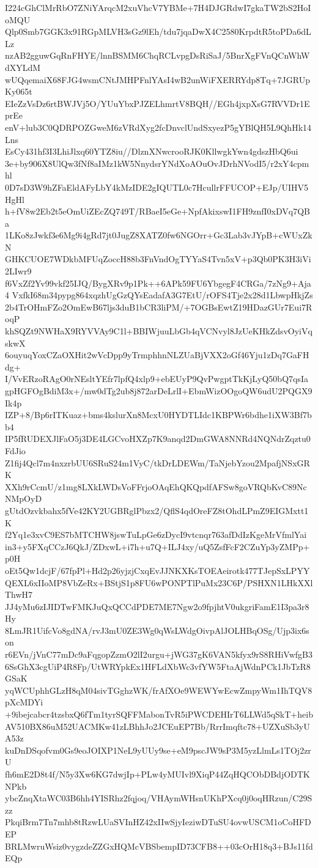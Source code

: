 I224cGhClMrRbO7ZNiYArqcM2xuVhcV7YBMe+7H4DJGRdwI7gkaTW2bS2HoIoMQU
Qlp0Smb7GGK3x91RGpMLVH3sGz9lEh/tdu7jqaDwX4C2580KrpdtR5toPDa6dLLz
nzAB2gguwGqRnFHYE/lnnBSMM6ChqRCLvpgDsRiSaJ/5BnrXgFVnQCnWhWdXYLdM
wUQqemaiX68FJG4wsmCNtJMHPFnlYAsI4wB2unWiFXERRYdp8Tq+7JGRUpKy065t
EIeZzVsDz6rtBWJVj5O/YUuYbxPJZELhmrtV8BQH//EGh4jxpXsG7RVVDr1EprEe
enV+lub3C0QDRPOZGweM6zVRdXyg2fcDnvclUndSxyezP5gYBlQH5L9QhHk14Lns
EsCy431hf3I3LhiJlxq60YTZ8iu//DlznXNwcrooRJK0KllwgkYwn4gdszHbQ6ui
3e+by906X8UlQw3fNf8aIMz1kW5NnydsrYNdXoAOuOvJDrhNVodI5/r2xY4cpmhl
0D7sD3W9hZFaEldAFyLbY4kMzIDE2gIQUTL0c7HcullrFFUCOP+EJp/UIHV5HgHl
h+fV8w2Eb2t5eOmUiZEcZQ749T/RBaeI5eGe+NpfAkixswI1FH9znfI0xDVq7QBa
1LKo8zJwkf3e6Mg9i4gRd7jt0JugZ8XATZ0fw6NGOrr+Gc3Lab3vJYpB+cWUxZkN
GHKCUOE7WDkbMFUqZoccH88b3FnVndOgTYYaS4Tvn5xV+p3Qb0PK3H3iVi2LIwr9
f6VxZf2Yv99vkf25IJQ/BygXRv9p1Pk++6APk59FU6YbgegF4CRGa/7zNg9+Aja4
VxfkI68m34pypg864xqzhUgGzQYsEadafA3G7EtU/rOFS4Tje2x28d1LbwpHkjZs
2b4TrOHmFZo2OmEwB67ljs3duB1bCR3liPM/+7OGBsEwtZ19HDazGUr7Eui7RoqP
khSQZt9NWHaX9RYVVAy9C1l+BBIWjuuLbGb4qVCNvyl8JzUeKHkZdsvOyiVqskwX
6ouyuqYoxCZaOXHit2wVcDpp9yTrmphhnNLZUaBjVXX2oGf46Yju1zDq7GaFHdg+
I/VvERzoRAgO0rNEsltYEfr7lpfQ4xlp9+ebEUyP9QvPwgptTkKjLyQ50bQ7qsIa
gpHGFOgBdiM3x+/mw0dTg2ub8j872arDeLrlI+EbmWizOOgoQW6udU2PQGX9Ik4p
IZP+8/Bp6rITKuaz+bms4kslurXn8McxU0HYDTLIdc1KBPWr6bdhe1iXW3Bf7bb4
IP5fRUDEXJlFaO5j3DE4LGCvoHXZp7K9anqd2DmGWA8NNRd4NQNdrZqztu0FdJio
Z1fij4Qcl7m4nxzrbUU6SRuS24m1VyC/tkDrLDEWm/TaNjebYzou2MpafjNSxGRK
XXh9rCcmU/z1mg8LXkLWDsVoFFrjoOAqEhQKQpdfAFSw8goVRQbKvC89NcNMpOyD
gUtdOzvkbahx5fVe42KY2UGBRglPbzx2/QflS4qdOreFZ8tOhdLPmZ9EIGMxtt1K
f2Yq1e3xvC9ES7bMTCHW8jswTuLpGe6zDycI9vtcnqr763afDdIzKgeMrVfmlYai
in3+y5FXqCCzJ6QkJ/ZDxwL+i7h+u7Q+ILJ4xy/uQ5ZsfFcF2CZuYp3yZMPp+p0H
oEt5Qw1dcjF/67fpPl+Hd2p26yjzjCxqEvJJNKXKsTOEAeirotk477TJepSxLPYY
QEXL6xIIoMP8VbZeRx+BStjS1p8FU6wPONPTlPuMx23C6P/PSHXN1LHkXXlThwH7
JJ4yMu6zIJIDTwFMKJuQxQCCdPDE7ME7Ngw2o9fpjhtV0ukgriFamE1I3pa3r8Hy
8LmJR1UifcVo8gdNA/rvJ3mU0ZE3Wg0qWsLWdgOivpAlJOLHBqOSg/Ujp3ix6son
r6EVn/jVnC77mDc9aFqgopZzmO2lI2urgu+jWG37gK6VAN5kfyx9rS8RHiVwfgB3
6SsGhX3cgUiP4R8Fp/UtWRYpkEx1HFLdXbWc3vfYW5FtaAjWdnPCk1JbTzR8GSaK
yqWCUphhGLzH8qM04sivTGghzWK/frAfXOe9WEWYwEcwZmpyWm1IhTQV8pXcMDYi
+9ibejcabcr4tzsbxQ6fTm1tyrSQFFMabonTvR5iPWCDEHIrT6LLWd5qSkT+heib
AV510BX86uM52UACMKw41zLBhhJo2JCEuEP7Bb/RrrImqftc78+UZXuSb3yUA53z
kuDnDSqofvm0Gs9eoJOIXP1NeL9yUUy9se+eM9pscJW9sP3M5yzLlmLs1TOj2zrU
fh6mE2D8t4f/N5y3Xw6KG7dwjIp+PLw4yMUIvl9XiqP44ZqHQCObDBdjODTKNPkb
ybcZnqXtaWC03B6hh4YISRhz2fqjoq/VHAymWHsnUKhPXcq0j0oqHRzun/C29Szz
PkqiBrm7Tn7mhb8tRzwLUaSVInHZ42xIIwSjyIeziwDTuSU4ovwUSCM1oCoHFDEP
BRLMwruWsiz0vygzdeZZGxHQMcVBSbempID73CFB8++03cOrH18q3+BJs11fdEQp
